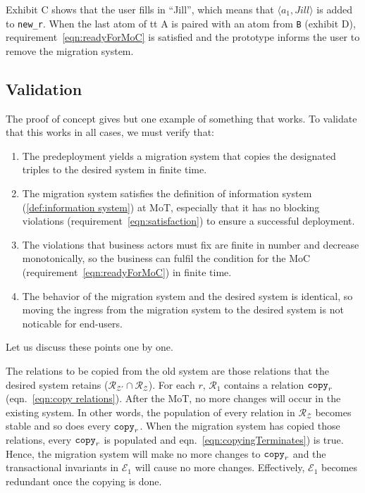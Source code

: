 \documentclass[runningheads]{llncs}
\newcommand{\pair}[2]{\langle{#1},{#2}\rangle}
\newcommand{\rels}{\mathcal{R}}   %
\newcommand{\transactions}{\mathcal{E}}
\newcommand{\schema}{\mathscr{Z}}
\begin{document}
   Exhibit C shows that the user fills in ``Jill'', which means that $\pair{a_1}{Jill}$ is added to {\small\verb#new_r#}.
   When the last atom of {tt A} is paired with an atom from {\tt B} (exhibit D), requirement~\ref{eqn:readyForMoC} is satisfied and the prototype informs the user to remove the migration system.

\subsection{Validation}
   The proof of concept gives but one example of something that works.
   To validate that this works in all cases, we must verify that:
\begin{enumerate}
\item The predeployment yields a migration system that copies the designated triples to the desired system in finite time.
\item The migration system satisfies the definition of information system (\ref{def:information system}) at MoT, especially that it has no blocking violations (requirement~\ref{eqn:satisfaction}) to ensure a successful deployment.
\item The violations that business actors must fix are finite in number and decrease monotonically, so the business can fulfil the condition for the MoC (requirement~\ref{eqn:readyForMoC}) in finite time.
\item The behavior of the migration system and the desired system is identical, so moving the ingress from the migration system to the desired system is not noticable for end-users.
\end{enumerate}
   Let us discuss these points one by one.

   The relations to be copied from the old system are those relations that the desired system retains ($\rels_{\schema'}\cap\rels_{\schema}$).
   For each $r$, $\rels_1$ contains a relation ${\tt copy}_r$ (eqn.~\ref{eqn:copy relations}).
   After the MoT, no more changes will occur in the existing system.
   In other words, the population of every relation in $\rels_{\schema}$ becomes stable and so does every ${\tt copy}_r$.
   When the migration system has copied those relations,
   every ${\tt copy}_r$ is populated and eqn.~\ref{eqn:copyingTerminates}) is true.
   Hence, the migration system will make no more changes to ${\tt copy}_r$ and the transactional invariants in $\transactions_1$ will cause no more changes. Effectively, $\transactions_1$ becomes redundant once the copying is done.
\end{document}
